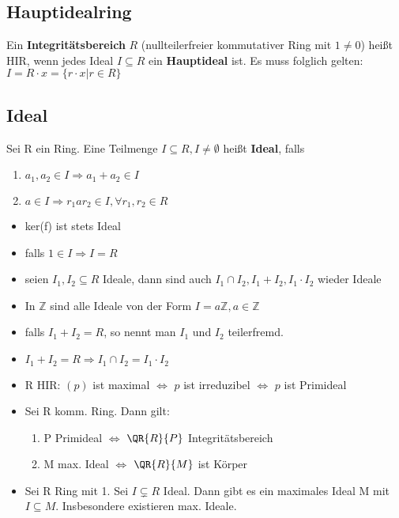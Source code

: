 \subsection{Hauptidealring}
Ein \textbf{Integritätsbereich} $R$ (nullteilerfreier kommutativer Ring mit $1 \neq 0$) heißt HIR, wenn jedes Ideal $I \subseteq R$ ein \textbf{Hauptideal} ist. Es muss folglich gelten:
$I = R \cdot x = \{ r \cdot x | r \in R\}$

\subsection{Ideal}
\begin{definition}
Sei R ein Ring. Eine Teilmenge $I \subseteq R, I \neq \emptyset$ heißt \textbf{Ideal}, falls
\begin{enumerate}
	\item $a_1,a_2 \in I \Rightarrow a_1+a_2 \in I$
	\item $a \in I \Rightarrow r_1 a r_2 \in I, \forall r_1,r_2 \in R$
\end{enumerate}
\end{definition}

\begin{remark}
\leavevmode
\begin{itemize}
	\item ker(f) ist stets Ideal
	\item falls $1 \in I \Rightarrow I = R$
	\item seien $I_1,I_2 \subseteq R$ Ideale, dann sind auch $I_1 \cap I_2, I_1+I_2, I_1 \cdot I_2$ wieder Ideale
	\item In $\mathbb{Z}$ sind alle Ideale von der Form $I=a\mathbb{Z}, a \in \mathbb{Z}$
	\item falls $I_1+I_2 = R$, so nennt man $I_1$ und $I_2$ teilerfremd.
	\item $I_1+I_2 = R \Rightarrow I_1 \cap I_2 = I_1 \cdot I_2$
	\item R HIR: $(p)$ ist maximal $ \Leftrightarrow $ $p$ ist irreduzibel $\Leftrightarrow$ $p$ ist Primideal
	\item Sei R komm. Ring. Dann gilt:
	\begin{enumerate}
		\item P Primideal $\Leftrightarrow$ $\QR{R}{P}$ Integritätsbereich
		\item M max. Ideal $\Leftrightarrow$ $\QR{R}{M}$ ist Körper
	\end{enumerate}
	\item Sei R Ring mit 1. Sei $I \subsetneq R $ Ideal. Dann gibt es ein maximales Ideal M mit $ I \subseteq M$. Insbesondere existieren max. Ideale.
\end{itemize}
\end{remark}

